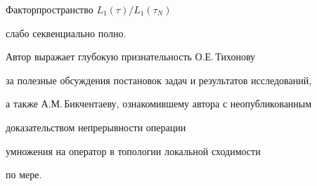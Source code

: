 \begin{thm}


Факторпространство $L_{1}({\tau})/L_{1}({\tau}_{N})$


слабо секвенциально полно.


\end{thm}





Автор выражает глубокую признательность О.Е.\,Тихонову


за полезные обсуждения постановок задач и результатов исследований,


а также А.М.\,Бикчентаеву, ознакомившему автора с неопубликованным


доказательством непрерывности операции


умножения на оператор в топологии локальной сходимости


по мере.





